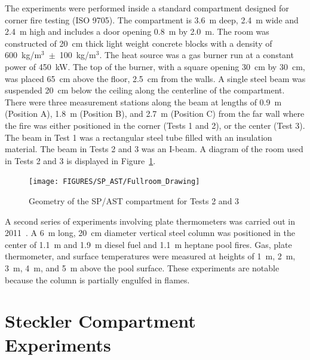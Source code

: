 The experiments were performed inside a standard compartment designed for corner fire testing (ISO 9705). The compartment is 3.6~m deep, 2.4~m wide and 2.4~m high and includes a door opening 0.8~m by 2.0~m. The room was constructed of 20~cm thick light weight concrete blocks with a density of 600~kg/m$^3$~$\pm$~100~kg/m$^3$. The heat source was a gas burner run at a constant power of 450~kW. The top of the burner, with a square opening 30~cm by 30~cm, was placed 65~cm above the floor, 2.5~cm from the walls. A single steel beam was suspended 20~cm below the ceiling along the centerline of the compartment. There were three measurement stations along the beam at lengths of 0.9~m (Position A), 1.8~m (Position B), and 2.7~m (Position C) from the far wall where the fire was either positioned in the corner (Tests 1 and 2), or the center (Test 3). The beam in Test 1 was a rectangular steel tube filled with an insulation material. The beam in Tests 2 and 3 was an I-beam. A diagram of the room used in Tests 2 and 3 is displayed in Figure~\ref{Room_Drawing}.

\begin{figure}[ht]
\begin{center}
\texttt{[image: FIGURES/SP\_AST/Fullroom\_Drawing]}
\end{center}
\caption{Geometry of the  SP/AST compartment for Tests 2 and 3}
\label{Room_Drawing}
\end{figure}

A second series of experiments involving plate thermometers was carried out in 2011~\cite{Sjostrom:AST}.
A 6~m long, 20~cm diameter vertical steel column was positioned in the center of 1.1~m and 1.9~m diesel fuel and 1.1~m heptane
pool fires. Gas, plate thermometer, and surface temperatures were measured at heights of 1~m, 2~m, 3~m, 4~m, and 5~m above the pool surface. These experiments are notable because
the column is partially engulfed in flames.

\section{Steckler Compartment Experiments}

